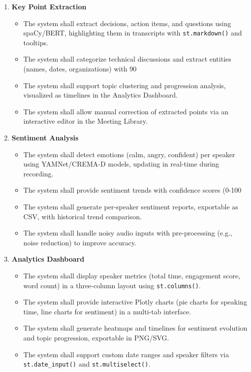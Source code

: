 \documentclass[12pt]{article}
\begin{document}
\begin{enumerate}
    \item \textbf{Key Point Extraction}
    \begin{itemize}
        \item The system shall extract decisions, action items, and questions using spaCy/BERT, highlighting them in transcripts with \texttt{st.markdown()} and tooltips.
        \item The system shall categorize technical discussions and extract entities (names, dates, organizations) with 90%
        \item The system shall support topic clustering and progression analysis, visualized as timelines in the Analytics Dashboard.
        \item The system shall allow manual correction of extracted points via an interactive editor in the Meeting Library.
    \end{itemize}
    \item \textbf{Sentiment Analysis}
    \begin{itemize}
        \item The system shall detect emotions (calm, angry, confident) per speaker using YAMNet/CREMA-D models, updating in real-time during recording.
        \item The system shall provide sentiment trends with confidence scores (0-100%
        \item The system shall generate per-speaker sentiment reports, exportable as CSV, with historical trend comparison.
        \item The system shall handle noisy audio inputs with pre-processing (e.g., noise reduction) to improve accuracy.
    \end{itemize}
    \item \textbf{Analytics Dashboard}
    \begin{itemize}
        \item The system shall display speaker metrics (total time, engagement score, word count) in a three-column layout using \texttt{st.columns()}.
        \item The system shall provide interactive Plotly charts (pie charts for speaking time, line charts for sentiment) in a multi-tab interface.
        \item The system shall generate heatmaps and timelines for sentiment evolution and topic progression, exportable in PNG/SVG.
        \item The system shall support custom date ranges and speaker filters via \texttt{st.date_input()} and \texttt{st.multiselect()}.

\end{itemize}
\end{enumerate}
\end{document}

